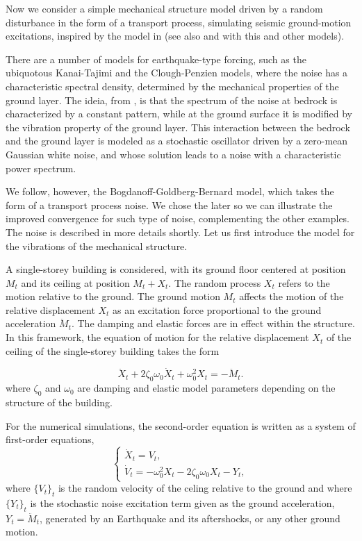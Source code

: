 \documentclass[reqno,12pt]{amsart}
\theoremstyle{plain} %
\theoremstyle{definition} %
\begin{document}
Now we consider a simple mechanical structure model driven by a random disturbance in the form of a transport process, simulating seismic ground-motion excitations, inspired by the model in \cite{BogdanoffGoldbergBernard1961} (see also \cite[Chapter 18]{NeckelRupp2013} and \cite{HousnerJenning1964} with this and other models).

There are a number of models for earthquake-type forcing, such as the ubiquotous Kanai-Tajimi and the Clough-Penzien models, where the noise has a characteristic spectral density, determined by the mechanical properties of the ground layer. The ideia, from \cite{Kanai1957}, is that the spectrum of the noise at bedrock is characterized by a constant pattern, while at the ground surface it is modified by the vibration property of the ground layer. This interaction between the bedrock and the ground layer is modeled as a stochastic oscillator driven by a zero-mean Gaussian white noise, and whose solution leads to a noise with a characteristic power spectrum.

We follow, however, the Bogdanoff-Goldberg-Bernard model, which takes the form of a transport process noise. We chose the later so we can illustrate the improved convergence for such type of noise, complementing the other examples. The noise is described in more details shortly. Let us first introduce the model for the vibrations of the mechanical structure.

A single-storey building is considered, with its ground floor centered at position $M_t$ and its ceiling at position $M_t + X_t$. The random process $X_t$ refers to the motion relative to the ground. The ground motion $M_t$ affects the motion of the relative displacement $X_t$ as an excitation force proportional to the ground acceleration $\ddot M_t$. The damping and elastic forces are in effect within the structure. In this framework, the equation of motion for the relative displacement $X_t$ of the ceiling of the single-storey building takes the form

\begin{equation}
    \label{mechanicalstructuremodel}
    \ddot X_t + 2\zeta_0\omega_0\dot X_t + \omega_0^2 X_t = - \ddot M_t.
\end{equation}
where $\zeta_0$ and $\omega_0$ are damping and elastic model parameters depending on the structure of the building.

For the numerical simulations, the second-order equation is written as a system of first-order equations,
\[
    \begin{cases}
        \dot X_t = V_t, \\
        \dot V_t = - \omega_0^2 X_t - 2\zeta_0\omega_0 X_t - Y_t,
    \end{cases}
\]
where $\{V_t\}_t$ is the random velocity of the celing relative to the ground and where $\{Y_t\}_t$ is the stochastic noise excitation term given as the ground acceleration, $Y_t = \ddot M_t$, generated by an Earthquake and its aftershocks, or any other ground motion.
\end{document}
